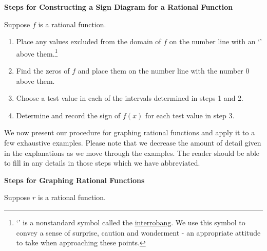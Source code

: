 \documentclass{ximera}
\begin{document}
\label{rationalsigndiagram}


\centerline{\textbf{Steps for Constructing a Sign Diagram for a  Rational Function}} 

\medskip

\hspace{.17in} Suppose $f$ is a rational function. 

\begin{enumerate}

\item  Place any values excluded from the domain of  $f$ on the number line with an `\textinterrobang' above them.\footnote{ `\textinterrobang' is a nonstandard symbol called the \href{http://en.wikipedia.org/wiki/Interrobang}{\underline{interrobang}}.   We use this symbol to convey a sense of surprise, caution and wonderment - an appropriate attitude to take when approaching these points.}   

\item  Find the zeros of $f$ and place them on the number line with the number $0$ above them.

\item  Choose a test value in each of the intervals determined in steps 1 and 2.

\item  Determine and record the sign of $f(x)$ for each test value in step 3.

\end{enumerate}


\medskip 

We now present our procedure for graphing rational functions and apply it to a few exhaustive examples.  Please note that we decrease the amount of detail given in the explanations as we move through the examples.  The reader should be able to fill in any details in those steps which we have abbreviated.

\medskip


\centerline{\textbf{Steps for Graphing Rational Functions}}

\medskip

\hspace{.17in} Suppose $r$ is a rational function. 
\end{document}
